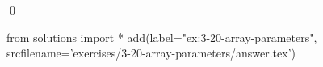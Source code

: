
\begin{ex}
  \label{ex:3-20-array-parameters}
  
  \qed
\end{ex}
\begin{python0}
from solutions import *
add(label="ex:3-20-array-parameters",
    srcfilename='exercises/3-20-array-parameters/answer.tex')
\end{python0}
